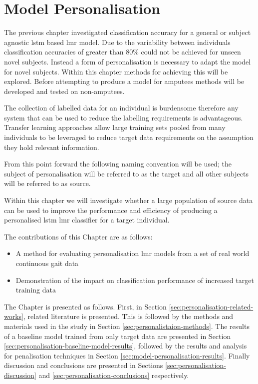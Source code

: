 \chapter{Model Personalisation}
\label{chp:personalisation}
The previous chapter investigated classification accuracy for a general or subject agnostic \acrshort{lstm} based \acrshort{lmr} model. Due to the variability between individuals classification accuracies of greater than 80\% could not be achieved for unseen novel subjects. Instead a form of personalisation is necessary to adapt the model for novel subjects. Within this chapter methods for achieving this will be explored. Before attempting to produce a model for amputees methods will be developed and tested on non-amputees.

The collection of labelled data for an individual is burdensome therefore any system that can be used to reduce the labelling requirements is advantageous. Transfer learning approaches allow large training sets pooled from many individuals to be leveraged to reduce target data requirements on the assumption they hold relevant information.\cite{Fallahzadeh2017, Schneider2021}

From this point forward the following naming convention will be used; the subject of personalisation will be referred to as the target and all other subjects will be referred to as source.

Within this chapter we will investigate whether a large population of source data can be used to improve the performance and efficiency of producing a personalised \acrshort{lstm} \acrshort{lmr} classifier for a target individual.

The contributions of this Chapter are as follows:
\begin{itemize}
    \item A method for evaluating personalisation \acrshort{lmr} models from a set of real world continuous gait data
    \item Demonstration of the impact on classification performance of increased target training data
\end{itemize}

The Chapter is presented as follows. First, in Section \ref{sec:personalisation-related-works}, related literature is presented. This is followed by the methods and materials used in the study in Section \ref{sec:personalistaion-methods}. The results of a baseline model trained from only target data are presented in Section \ref{sec:personalisation-baseline-model-results}, followed by the results and analysis for penalisation techniques in Section \ref{sec:model-personalisation-results}. Finally discussion and conclusions are presented in Sections \ref{sec:personalisation-discussion} and \ref{sec:personalisation-conclusions} respectively.

